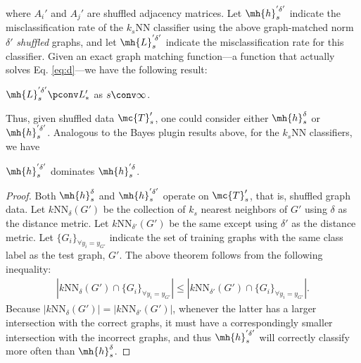 \documentclass[10pt,journal,cspaper,compsoc]{IEEEtran}
\begin{document}
where $A_i'$ and $A_j'$ are shuffled adjacency matrices.  
Let $\mh{h}^{'\delta'}_s$ indicate the misclassification rate of the $k_s$NN classifier using the above graph-matched norm $\delta'$ \emph{shuffled} graphs, and let $\mh{L}^{'\delta'}_s$ indicate the misclassification rate for this classifier.  Given an exact graph matching function---a function that actually solves Eq. \eqref{eq:d}---we have the following result:
\begin{coro} \label{cor:Sh_knn}
	$\mh{L}^{'\delta'}_s \pconv L_*'$ as $s \conv \infty$.
\end{coro}
Thus, given shuffled data $\mc{T}_s'$, one could consider either $\mh{h}_s^{\delta}$ or $\mh{h}_s^{'\delta'}$.  Analogous to the Bayes plugin results above, for the $k_s$NN classifiers, we have 
\begin{thm} \label{thm:knninadmiss}
	$\mh{h}_s^{'\delta'}$ dominates $\mh{h}_s^{'\delta}$.
\end{thm}
\begin{proof}
	Both $\mh{h}_s^{\delta}$ and $\mh{h}_s^{'\delta'}$ operate on $\mc{T}_s'$, that is, shuffled graph data.  Let $k$NN$_{\delta}(G')$ be the collection of $k_s$ nearest neighbors of $G'$ using $\delta$ as the distance metric.  Let $k$NN$_{\delta'}(G')$ be the same except using $\delta'$ as the distance metric.  Let $\{G_i\}_{\forall y_i=y_{G'}}$ indicate the set of training graphs with the same class label as the test graph, $G'$.  The above theorem follows from the following inequality:
\begin{align}
|k\text{NN}_{\delta}(G') \cap \{G_i\}_{\forall y_i=y_{G'}}| \leq |k\text{NN}_{\delta'}(G') \cap \{G_i\}_{\forall y_i=y_{G'}}|.
\end{align}
Because $|k\text{NN}_{\delta}(G')|=|k\text{NN}_{\delta'}(G')|$, whenever the latter has a larger intersection with the correct graphs, it must have a correspondingly smaller intersection with the incorrect graphs, and thus $\mh{h}_s^{'\delta'}$ will correctly classify more often than $\mh{h}_s^{\delta}$.
\end{proof}
\end{document}
